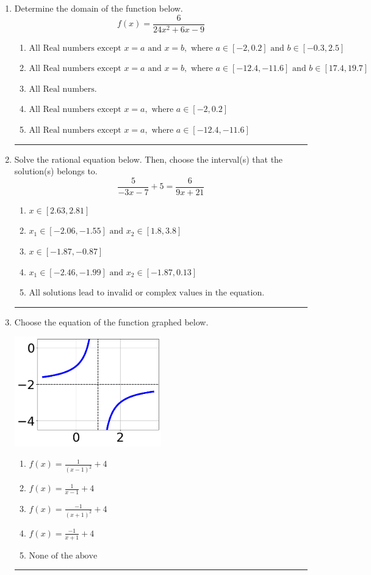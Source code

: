 \documentclass[14pt]{extbook}
\newcommand{\litem}[1]{\item#1\hspace*{-1cm}\rule{\textwidth}{0.4pt}}
\begin{document}
\begin{enumerate}
{\begin{enumerate}[label=\Alph*.]
\end{enumerate} }
\litem{
Determine the domain of the function below.\[ f(x) = \frac{6}{24x^{2} +6 x -9} \]\begin{enumerate}[label=\Alph*.]
\item \( \text{All Real numbers except } x = a \text{ and } x = b, \text{ where } a \in [-2, 0.2] \text{ and } b \in [-0.3, 2.5] \)
\item \( \text{All Real numbers except } x = a \text{ and } x = b, \text{ where } a \in [-12.4, -11.6] \text{ and } b \in [17.4, 19.7] \)
\item \( \text{All Real numbers.} \)
\item \( \text{All Real numbers except } x = a, \text{ where } a \in [-2, 0.2] \)
\item \( \text{All Real numbers except } x = a, \text{ where } a \in [-12.4, -11.6] \)

\end{enumerate} }
\litem{
Solve the rational equation below. Then, choose the interval(s) that the solution(s) belongs to.\[ \frac{5}{-3x -7} + 5 = \frac{6}{9x + 21} \]\begin{enumerate}[label=\Alph*.]
\item \( x \in [2.63,2.81] \)
\item \( x_1 \in [-2.06, -1.55] \text{ and } x_2 \in [1.8,3.8] \)
\item \( x \in [-1.87,-0.87] \)
\item \( x_1 \in [-2.46, -1.99] \text{ and } x_2 \in [-1.87,0.13] \)
\item \( \text{All solutions lead to invalid or complex values in the equation.} \)

\end{enumerate} }
\litem{
Choose the equation of the function graphed below.
\begin{center}
    \includegraphics[width=0.5\textwidth]{../Figures/rationalGraphToEquationCopyB.png}
\end{center}
\begin{enumerate}[label=\Alph*.]
\item \( f(x) = \frac{1}{(x - 1)^2} + 4 \)
\item \( f(x) = \frac{1}{x - 1} + 4 \)
\item \( f(x) = \frac{-1}{(x + 1)^2} + 4 \)
\item \( f(x) = \frac{-1}{x + 1} + 4 \)
\item \( \text{None of the above} \)


\end{enumerate}}
\end{enumerate}
\end{document}
